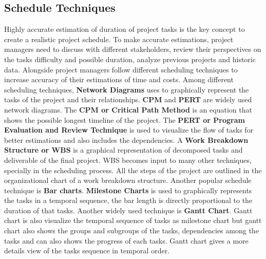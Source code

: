 \begin{spacing}{1}
\section{Schedule Techniques}
Highly accurate estimation of duration of project tasks is the key concept to create a realistic project schedule. To make accurate estimations, project managers need to discuss with different stakeholders, review their perspectives on the tasks difficulty and possible duration, analyze previous projects and historic data. Alongside project managers follow different scheduling techniques to increase accuracy of their estimations of time and costs. 
Among different scheduling techniques, \textbf{Network Diagrams} uses to graphically represent the tasks of the project and their relationships. \textbf{CPM} and \textbf{PERT} are widely used network diagrams. The \textbf{CPM or Critical Path Method} is an equation that shows the possible longest timeline of the project. The \textbf{PERT or Program Evaluation and Review Technique} is used to visualize the flow of tasks for better estimations and also includes the dependencies.
 A \textbf{Work Breakdown Structure or WBS} is a graphical representation of decomposed tasks and deliverable of the final project. WBS becomes input to many other techniques, specially in the scheduling process. All the steps of the project are outlined in the organizational chart of a work breakdown structure.
 Another popular schedule technique is \textbf{Bar charts}. \textbf{Milestone Charts} is used to graphically represents the tasks in a temporal sequence, the bar length is directly proportional to the duration of that tasks. Another widely used technique is \textbf{Gantt Chart}. Gantt chart is also visualize the temporal sequence of tasks as milestone chart but gantt chart also shows the groups and subgroups of the tasks, dependencies among the tasks and can also shows the progress of each tasks. Gantt chart gives a more details view of the tasks sequence in temporal order.
 

\end{spacing}
